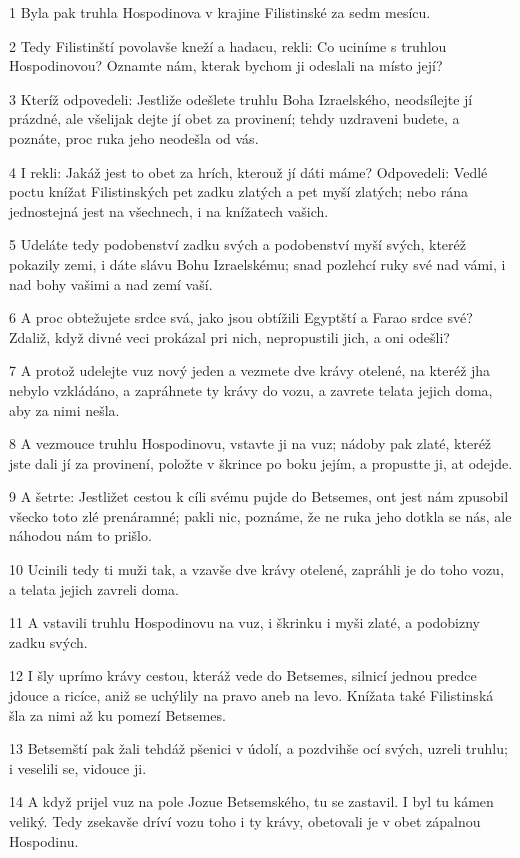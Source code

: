 \par 1 Byla pak truhla Hospodinova v krajine Filistinské za sedm mesícu.
\par 2 Tedy Filistinští povolavše kneží a hadacu, rekli: Co uciníme s truhlou Hospodinovou? Oznamte nám, kterak bychom ji odeslali na místo její?
\par 3 Kteríž odpovedeli: Jestliže odešlete truhlu Boha Izraelského, neodsílejte jí prázdné, ale všelijak dejte jí obet za provinení; tehdy uzdraveni budete, a poznáte, proc ruka jeho neodešla od vás.
\par 4 I rekli: Jakáž jest to obet za hrích, kterouž jí dáti máme? Odpovedeli: Vedlé poctu knížat Filistinských pet zadku zlatých a pet myší zlatých; nebo rána jednostejná jest na všechnech, i na knížatech vašich.
\par 5 Udeláte tedy podobenství zadku svých a podobenství myší svých, kteréž pokazily zemi, i dáte slávu Bohu Izraelskému; snad pozlehcí ruky své nad vámi, i nad bohy vašimi a nad zemí vaší.
\par 6 A proc obtežujete srdce svá, jako jsou obtížili Egyptští a Farao srdce své? Zdaliž, když divné veci prokázal pri nich, nepropustili jich, a oni odešli?
\par 7 A protož udelejte vuz nový jeden a vezmete dve krávy otelené, na kteréž jha nebylo vzkládáno, a zapráhnete ty krávy do vozu, a zavrete telata jejich doma, aby za nimi nešla.
\par 8 A vezmouce truhlu Hospodinovu, vstavte ji na vuz; nádoby pak zlaté, kteréž jste dali jí za provinení, položte v škrince po boku jejím, a propustte ji, at odejde.
\par 9 A šetrte: Jestližet cestou k cíli svému pujde do Betsemes, ont jest nám zpusobil všecko toto zlé prenáramné; pakli nic, poznáme, že ne ruka jeho dotkla se nás, ale náhodou nám to prišlo.
\par 10 Ucinili tedy ti muži tak, a vzavše dve krávy otelené, zapráhli je do toho vozu, a telata jejich zavreli doma.
\par 11 A vstavili truhlu Hospodinovu na vuz, i škrinku i myši zlaté, a podobizny zadku svých.
\par 12 I šly uprímo krávy cestou, kteráž vede do Betsemes, silnicí jednou predce jdouce a ricíce, aniž se uchýlily na pravo aneb na levo. Knížata také Filistinská šla za nimi až ku pomezí Betsemes.
\par 13 Betsemští pak žali tehdáž pšenici v údolí, a pozdvihše ocí svých, uzreli truhlu; i veselili se, vidouce ji.
\par 14 A když prijel vuz na pole Jozue Betsemského, tu se zastavil. I byl tu kámen veliký. Tedy zsekavše dríví vozu toho i ty krávy, obetovali je v obet zápalnou Hospodinu.
